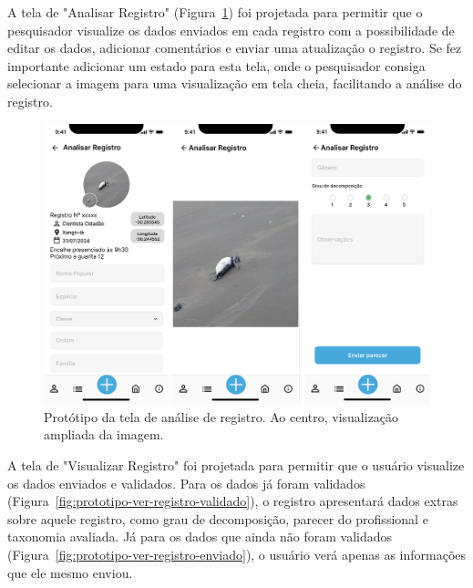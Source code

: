 A tela de "Analisar Registro" (Figura~\ref{fig:prototipo-avaliar-registro}) foi projetada para 
permitir que o pesquisador visualize os dados enviados em cada registro 
com a possibilidade de editar os dados, adicionar comentários e enviar uma atualização o registro.
Se fez importante adicionar um estado para esta tela, onde o pesquisador consiga selecionar a imagem
para uma visualização em tela cheia, facilitando a análise do registro.

\begin{figure}[H]
    \centering
    \includegraphics[height=0.55\textheight, width=\textwidth]{imagens/avaliar-registro-figma.png}
    \caption{Protótipo da tela de análise de registro. Ao centro, visualização ampliada da imagem.}
    \label{fig:prototipo-avaliar-registro}
\end{figure}

A tela de "Visualizar Registro" foi projetada para permitir que o usuário visualize os dados
enviados e validados. Para os dados já foram validados 
(Figura~\ref{fig:prototipo-ver-registro-validado}), o registro apresentará dados extras 
sobre aquele registro, como grau de decomposição, parecer do profissional e taxonomia avaliada.
Já para os dados que ainda não foram validados (Figura~\ref{fig:prototipo-ver-registro-enviado}), 
o usuário verá apenas as informações que ele mesmo enviou.

